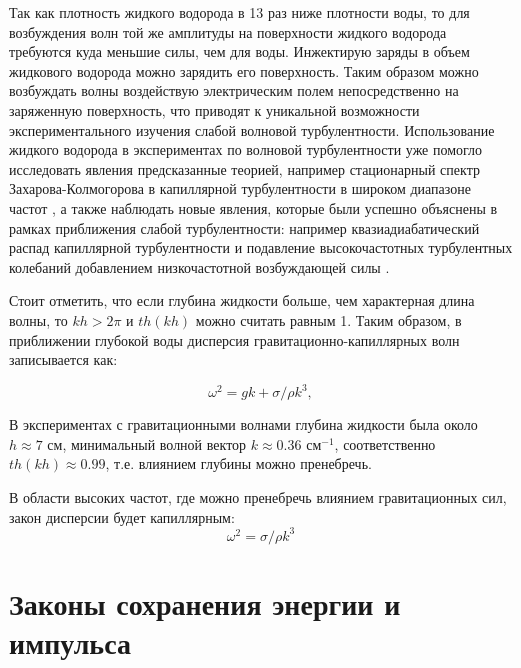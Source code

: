 Так как плотность жидкого водорода в 13 раз ниже плотности воды, то для возбуждения волн той же амплитуды на поверхности жидкого водорода требуются куда меньшие силы, чем для воды. Инжектирую заряды в объем жидкового водорода можно зарядить его поверхность. Таким образом можно возбуждать волны воздействую электрическим полем непосредственно на заряженную поверхность, что приводят к уникальной возможности экспериментального изучения слабой волновой турбулентности. Использование жидкого водорода в экспериментах по волновой турбулентности уже помогло исследовать явления предсказанные теорией, например стационарный спектр Захарова-Колмогорова в капиллярной турбулентности в широком диапазоне частот \cite{Brazhnikov2001}, а также наблюдать новые явления, которые были успешно объяснены в рамках  приближения слабой турбулентности: например квазиадиабатический распад капиллярной турбулентности \cite{quasiadiabatic} и подавление высокочастотных турбулентных колебаний добавлением низкочастотной возбуждающей силы \cite{addLowFreq}.

Стоит отметить, что если глубина жидкости больше, чем характерная длина волны, то $kh > 2\pi$ и $th(kh)$ можно считать равным 1. Таким образом, в приближении глубокой воды дисперсия гравитационно-капиллярных волн записывается как:


\begin{equation}
 \label{eq:disper}
\omega^2 = gk + \sigma/\rho k^3,
\end{equation}


В экспериментах с гравитационными волнами глубина жидкости была около $ h \approx 7$ см, минимальный волной вектор $k \approx 0.36$ см$^{-1}$, соответственно $th(kh) \approx 0.99$, т.е. влиянием глубины можно пренебречь.


В области высоких частот, где можно пренебречь влиянием гравитационных сил, закон дисперсии будет капиллярным:
\begin{equation}
 \label{eq:disperCap}
\omega^2 = \sigma/\rho k^3
\end{equation}


\section{Законы сохранения энергии и импульса} %

